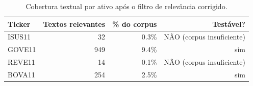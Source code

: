 \begin{table}[htbp]
\centering
\caption{Cobertura textual por ativo após o filtro de relevância corrigido.}
\label{tab:cobertura-corpus}
\begin{tabular}{lrrr}
\toprule
Ticker & Textos relevantes & \% do corpus & Testável? \\
\midrule
ISUS11 & 32 & 0.3\% & NÃO (corpus insuficiente) \\
GOVE11 & 949 & 9.4\% & sim \\
REVE11 & 14 & 0.1\% & NÃO (corpus insuficiente) \\
BOVA11 & 254 & 2.5\% & sim \\
\bottomrule
\end{tabular}
\end{table}
